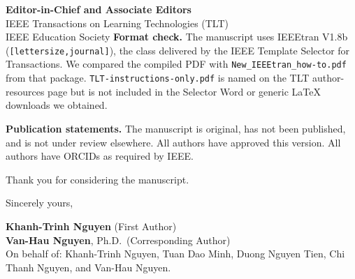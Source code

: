 \documentclass[11pt]{letter}
\begin{document}
\begin{letter}{
\textbf{Editor-in-Chief and Associate Editors}\\
IEEE Transactions on Learning Technologies (TLT)\\
IEEE Education Society
}
\textbf{Format check.} The manuscript uses IEEEtran V1.8b (\texttt{[lettersize,journal]}), the class delivered by the IEEE Template Selector for Transactions. We compared the compiled PDF with \texttt{New\_IEEEtran\_how-to.pdf} from that package. \texttt{TLT-instructions-only.pdf} is named on the TLT author-resources page but is not included in the Selector Word or generic LaTeX downloads we obtained.

\textbf{Publication statements.} The manuscript is original, has not been published, and is not under review elsewhere. All authors have approved this version. All authors have ORCIDs as required by IEEE.

Thank you for considering the manuscript.

\closing{Sincerely yours,}

\vspace{0.3cm}
\noindent\textbf{Khanh-Trinh Nguyen} (First Author)\\
\textbf{Van-Hau Nguyen}, Ph.D.\ (Corresponding Author)\\
On behalf of: Khanh-Trinh Nguyen, Tuan Dao Minh, Duong Nguyen Tien, Chi Thanh Nguyen, and Van-Hau Nguyen.

\end{letter}
\end{document}
